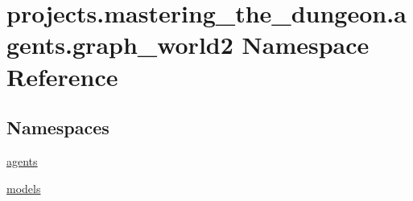 \hypertarget{namespaceprojects_1_1mastering__the__dungeon_1_1agents_1_1graph__world2}{}\section{projects.\+mastering\+\_\+the\+\_\+dungeon.\+agents.\+graph\+\_\+world2 Namespace Reference}
\label{namespaceprojects_1_1mastering__the__dungeon_1_1agents_1_1graph__world2}
\subsection*{Namespaces}
\begin{DoxyCompactItemize}
\item 
 \hyperlink{namespaceprojects_1_1mastering__the__dungeon_1_1agents_1_1graph__world2_1_1agents}{agents}
\item 
 \hyperlink{namespaceprojects_1_1mastering__the__dungeon_1_1agents_1_1graph__world2_1_1models}{models}
\end{DoxyCompactItemize}
